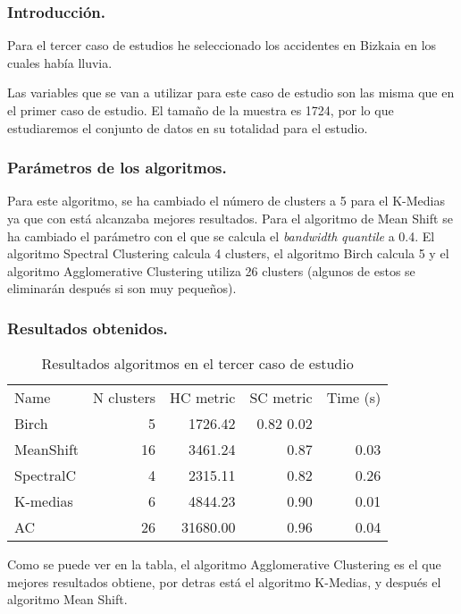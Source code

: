	\subsubsection{Introducción.}
	Para el tercer caso de estudios he seleccionado los accidentes en Bizkaia en los cuales había lluvia.
	
	\vspace{0.06in}
	Las variables que se van a utilizar para este caso de estudio son las misma que en el primer caso de estudio. El tamaño de la muestra es 1724, por lo que estudiaremos el conjunto de datos en su totalidad para el estudio.
	
	\subsubsection{Parámetros de los algoritmos.}
	Para este algoritmo, se ha cambiado el número de clusters a 5 para el K-Medias ya que con está alcanzaba mejores resultados. Para el algoritmo de Mean Shift se ha cambiado el parámetro con el que se calcula el \textit{bandwidth} \textit{quantile} a 0.4. El algoritmo Spectral Clustering calcula 4 clusters, el algoritmo Birch calcula 5 y el algoritmo Agglomerative Clustering utiliza 26 clusters (algunos de estos se eliminarán después si son muy pequeños).
	\subsubsection{Resultados obtenidos.}
	\begin{table}[H]
	\centering
		\begin{tabular}{lrrrr}
			\toprule
			Name&       	N clusters&	HC metric& 	SC metric& 	Time (s) \\  
			Birch&        	5&         	1726.42&   	0.82      	0.02 \\      
			MeanShift&      	16&        	3461.24&   	0.87&      	0.03 \\     
			SpectralC&      	4&         	2315.11&   	0.82&      	0.26 \\      
			K-medias&       	6&         	4844.23&   	0.90&      	0.01 \\      
			AC&             	26&        	31680.00&  	0.96&      	0.04 \\      
			\bottomrule
		\end{tabular}
	\caption{Resultados algoritmos en el tercer caso de estudio}
	\label{table:res_caso3}
	\end{table}

	\vspace{0.06in}
	Como se puede ver en la tabla, el algoritmo Agglomerative Clustering es el que mejores resultados obtiene, por detras está el algoritmo K-Medias, y después el algoritmo Mean Shift.
	
